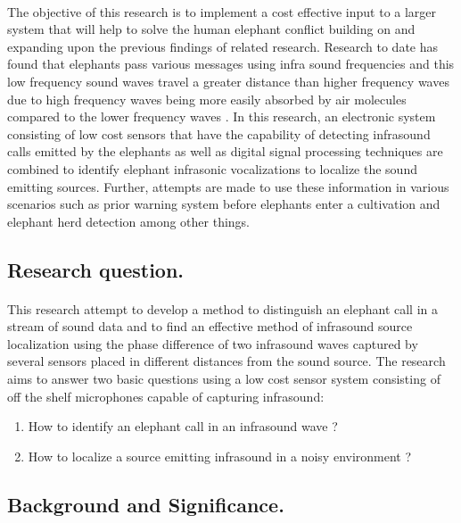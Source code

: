 \documentclass[11pt]{article}
\numberwithin{figure}{section}
\numberwithin{table}{section}
\begin{document}
\paragraph{}
The objective of this research is to implement  a cost effective input to a larger system that will help to solve the human elephant conflict building on and expanding upon the previous findings of related research. Research to date has found that elephants pass various messages using infra sound frequencies and this low frequency sound waves travel a greater distance than higher frequency waves  due to high frequency waves being more easily absorbed by air molecules compared to the lower frequency waves \cite {5}. In this research, an electronic system consisting of low cost sensors that have the capability of detecting infrasound calls emitted by the elephants as well as digital signal processing techniques are combined to  identify elephant  infrasonic vocalizations to localize the sound emitting sources. Further, attempts are made to use these information in various scenarios such as prior warning system before elephants enter a cultivation and elephant herd detection among other things.

\subsection{Research question.} 
\paragraph{}
This research attempt to develop a method to distinguish an elephant call in a stream of sound data and to find an effective method of infrasound source localization using the phase difference of two infrasound waves captured by several sensors placed in different distances from the sound source. The research aims to answer two basic questions using a low cost sensor system consisting of off the shelf microphones capable of capturing infrasound:

\begin{enumerate}
\item How to identify an elephant call in an infrasound wave ? 
\item How to  localize a source emitting infrasound in a noisy environment ?
\end{enumerate}


\subsection{Background and Significance.} 
\end{document}
